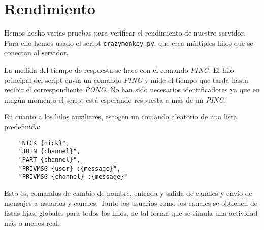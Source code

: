 \documentclass[nochap]{apuntes}
\begin{document}
\section{Rendimiento}

Hemos hecho varias pruebas para verificar el rendimiento de nuestro servidor. Para ello hemos usado el script \texttt{crazymonkey.py}, que crea múltiples hilos que se conectan al servidor. 

La medida del tiempo de respuesta se hace con el comando \textit{PING}. El hilo principal del script envía un comando \textit{PING} y mide el tiempo que tarda hasta recibir el correspondiente \textit{PONG}. No han sido necesarios identificadores ya que en ningún momento el script está esperando respuesta a más de un \textit{PING}.

En cuanto a los hilos auxiliares, escogen un comando aleatorio de una lista predefinida:

\begin{verbatim}
	"NICK {nick}",
	"JOIN {channel}",
	"PART {channel}",
	"PRIVMSG {user} :{message}",
	"PRIVMSG {channel} :{message}"
\end{verbatim}

Esto es, comandos de cambio de nombre, entrada y salida de canales y envío de mensajes a usuarios y canales. Tanto los usuarios como los canales se obtienen de listas fijas, globales para todos los hilos, de tal forma que se simula una actividad más o menos real.
\end{document}
